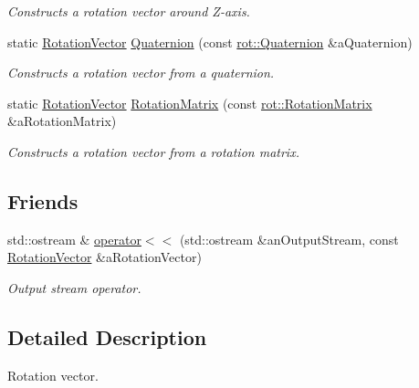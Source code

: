 \begin{DoxyCompactItemize}
\begin{DoxyCompactList}\small\item\em Constructs a rotation vector around Z-\/axis. \end{DoxyCompactList}\item 
static \hyperlink{classlibrary_1_1math_1_1geom_1_1d3_1_1trf_1_1rot_1_1_rotation_vector}{Rotation\+Vector} \hyperlink{classlibrary_1_1math_1_1geom_1_1d3_1_1trf_1_1rot_1_1_rotation_vector_a6da4ed18679e28816896de413e04ed79}{Quaternion} (const \hyperlink{classlibrary_1_1math_1_1geom_1_1d3_1_1trf_1_1rot_1_1_quaternion}{rot\+::\+Quaternion} \&a\+Quaternion)
\begin{DoxyCompactList}\small\item\em Constructs a rotation vector from a quaternion. \end{DoxyCompactList}\item 
static \hyperlink{classlibrary_1_1math_1_1geom_1_1d3_1_1trf_1_1rot_1_1_rotation_vector}{Rotation\+Vector} \hyperlink{classlibrary_1_1math_1_1geom_1_1d3_1_1trf_1_1rot_1_1_rotation_vector_a397807ffe12bb72cd788660b83bdf7b3}{Rotation\+Matrix} (const \hyperlink{classlibrary_1_1math_1_1geom_1_1d3_1_1trf_1_1rot_1_1_rotation_matrix}{rot\+::\+Rotation\+Matrix} \&a\+Rotation\+Matrix)
\begin{DoxyCompactList}\small\item\em Constructs a rotation vector from a rotation matrix. \end{DoxyCompactList}\end{DoxyCompactItemize}
\subsection*{Friends}
\begin{DoxyCompactItemize}
\item 
std\+::ostream \& \hyperlink{classlibrary_1_1math_1_1geom_1_1d3_1_1trf_1_1rot_1_1_rotation_vector_aa66ba2fd706a441ee39d06857842ecfe}{operator$<$$<$} (std\+::ostream \&an\+Output\+Stream, const \hyperlink{classlibrary_1_1math_1_1geom_1_1d3_1_1trf_1_1rot_1_1_rotation_vector}{Rotation\+Vector} \&a\+Rotation\+Vector)
\begin{DoxyCompactList}\small\item\em Output stream operator. \end{DoxyCompactList}\end{DoxyCompactItemize}


\subsection{Detailed Description}
Rotation vector. 

